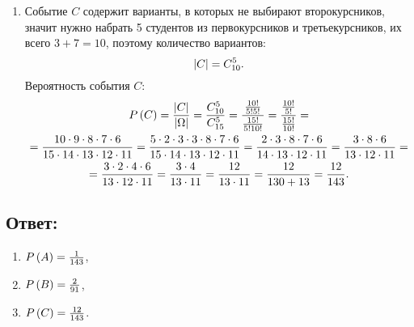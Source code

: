 \begin{enumerate}
    \item
    Событие $C$ содержит варианты, в которых не выбирают второкурсников, значит нужно набрать 5 студентов из первокурсников и третьекурсников, их всего $3 + 7 = 10$, поэтому
    количество вариантов:
    \begin{equation}
        \left | C \right | = C_{10}^5 .
    \end{equation}
    Вероятность события $C$:
    \begin{multline}
        P \left ( C \right )
        = \frac{\left | C \right |}{\left | \Omega \right |}
        = \frac{C_{10}^5}{C_{15}^5}
        = \frac{\frac{10!}{5!5!}}{\frac{15!}{5!10!}}
        = \frac{\frac{10!}{5!}}{\frac{15!}{10!}} = \\
        = \frac{10 \cdot 9 \cdot 8 \cdot 7 \cdot 6}{15 \cdot 14 \cdot 13 \cdot 12 \cdot 11}
        = \frac{5 \cdot 2 \cdot 3 \cdot 3 \cdot 8 \cdot 7 \cdot 6}{15 \cdot 14 \cdot 13 \cdot 12 \cdot 11}
        = \frac{2 \cdot 3 \cdot 8 \cdot 7 \cdot 6}{14 \cdot 13 \cdot 12 \cdot 11}
        = \frac{3 \cdot 8 \cdot 6}{13 \cdot 12 \cdot 11} = \\
        = \frac{3 \cdot 2 \cdot 4 \cdot 6}{13 \cdot 12 \cdot 11}
        = \frac{3 \cdot 4}{13 \cdot 11}
        = \frac{12}{13 \cdot 11}
        = \frac{12}{130 + 13}
        = \frac{12}{143} .
    \end{multline}
\end{enumerate}

\subsection*{Ответ:}
\begin{enumerate}
    \item $P \left ( A \right ) = \frac{1}{143}$,
    \item $P \left ( B \right ) = \frac{2}{91}$,
    \item $P \left ( C \right ) = \frac{12}{143}$.
\end{enumerate}